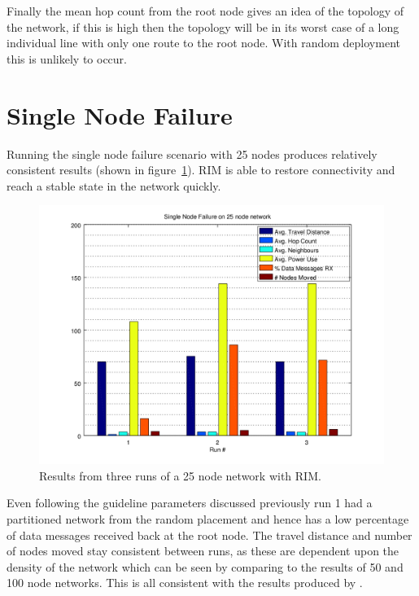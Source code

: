 \documentclass[authoryearcitations]{UoYCSproject}
\begin{document}
Finally the mean hop count from the root node gives an idea of the topology of the network, if this is high then the topology will be in its worst case of a long individual line with only one route to the root node. With random deployment this is unlikely to occur.

\section{Single Node Failure}

Running the single node failure scenario with 25 nodes produces relatively consistent results (shown in figure~\ref{fig:singlefail_25node}). RIM is able to restore connectivity and reach a stable state in the network quickly.

\begin{figure}
 \centering
    \includegraphics[width=\textwidth]{figures/singlefail_25node.png}
    \caption{Results from three runs of a 25 node network with RIM.}
    \label{fig:singlefail_25node}
\end{figure}

Even following the guideline parameters discussed previously run 1 had a partitioned network from the random placement and hence has a low percentage of data messages received back at the root node. The travel distance and number of nodes moved stay consistent between runs, as these are dependent upon the density of the network which can be seen by comparing to the results of 50 and 100 node networks. This is all consistent with the results produced by \citeauthor*{Younis2010}.
\end{document}
